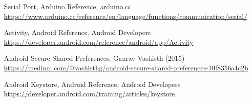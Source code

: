 \begin{thebibliography}{99}
Serial Port, Arduino Reference, arduino.cc\\
\url{https://www.arduino.cc/reference/en/language/functions/communication/serial/}

Activity, Android Reference, Android Developers\\
\url{https://developer.android.com/reference/android/app/Activity}

Android Secure Shared Preferences, Gaurav Vashisth (2015)\\
\url{https://medium.com/@vashisthg/android-secure-shared-preferences-10f8356a4c2b}

Android Keystore, Android Reference, Android Developers\\
\url{https://developer.android.com/training/articles/keystore}

\end{thebibliography}